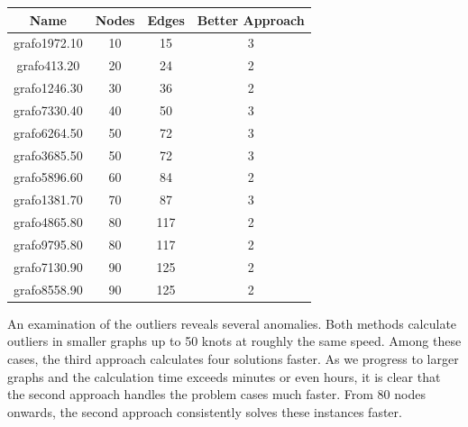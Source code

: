 \documentclass[bachelor, english]{algothesis}
\begin{document}
\begin{minipage}{0.65\textwidth}
\vspace{-0.1cm}
\begin{tabular}{|c|c|c|c|}
\hline
Name & Nodes & Edges & Better Approach\\
\hline
grafo1972.10 & 10 & 15 & 3\\
\hline
grafo413.20 & 20 & 24 & 2\\
\hline
grafo1246.30 & 30 & 36 & 2\\
\hline
grafo7330.40 & 40 & 50 & 3\\
\hline
grafo6264.50 & 50 & 72 & 3\\
grafo3685.50 & 50 & 72 & 3\\
\hline
grafo5896.60 & 60 & 84 & 2\\
\hline
grafo1381.70 & 70 & 87 & 3\\
\hline
grafo4865.80  & 80 & 117 & 2\\
grafo9795.80 & 80 & 117 & 2\\
\hline
grafo7130.90 & 90 & 125 & 2\\
grafo8558.90 & 90 & 125 & 2\\
\hline
\end{tabular}
\label{tab:Shared_Outliner}
\end{minipage}
\begin{minipage}{0.35\textwidth}
\vspace{+0.2cm}
An examination of the outliers reveals several anomalies. Both methods calculate outliers in smaller graphs up to 50 knots at roughly the same speed. Among these cases, the third approach calculates four solutions faster. As we progress to larger graphs and the calculation time exceeds minutes or even hours, it is clear that the second approach handles the problem cases much faster. From 80 nodes onwards, the second approach consistently solves these instances faster. 
\end{minipage}
\end{document}
